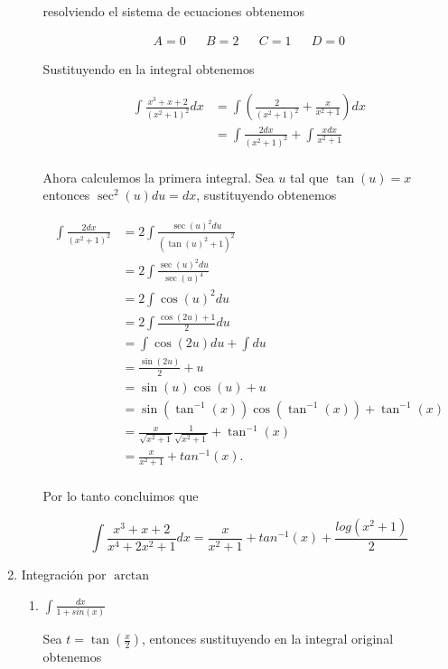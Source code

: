 \documentclass[letterpaper]{article}
\theoremstyle{definition}
\theoremstyle{lemathm}
\theoremstyle{lemademthm}
\begin{document}
\begin{enumerate}
\begin{enumerate}
			resolviendo el sistema de ecuaciones obtenemos

			\begin{align*}
				A = 0 && B = 2 && C = 1 && D = 0
			\end{align*}

			Sustituyendo en la integral obtenemos

			\begin{align*}
				\int \frac{x^3+x+2}{(x^2+1)^2} dx &= \int \left(\frac{2}{(x^2+1)^2} + \frac{x}{x^2+1}\right)dx\\
				&= \int \frac{2dx}{(x^2+1)^2} + \int\frac{xdx}{x^2+1}\\
			\end{align*}

			Ahora calculemos la primera integral. Sea $u$ tal que $\tan(u) = x$ entonces $\sec^2(u)du = dx$, sustituyendo obtenemos

			\begin{align*}
				\int \frac{2dx}{(x^2+1)^2} &= 2\int \frac{\sec(u)^2du}{(\tan(u)^2 + 1)^2}\\
				&= 2\int \frac{\sec(u)^2du}{\sec(u)^4}\\
				&= 2\int \cos(u)^2du\\
				&= 2\int \frac{\cos(2u)+1}{2}du\\
				&= \int \cos(2u)du + \int du\\
				&= \frac{\sin(2u)}{2} + u\\
				&= \sin(u)\cos(u) + u\\
				&= \sin(\tan^{-1}(x))\cos(\tan^{-1}(x)) + \tan^{-1}(x)\\
				&= \frac{x}{\sqrt{x^2 + 1}}\frac{1}{\sqrt{x^2+1}} + \tan^{-1}(x)\\
				&= \frac{x}{x^2 + 1} + tan^{-1}(x).\\
			\end{align*}

			Por lo tanto concluimos que

			\[\int \frac{x^3+x+2}{x^4+2x^2+1}dx = \frac{x}{x^2 + 1} + tan^{-1}(x) + \frac{log(x^2+1)}{2}\]

        \end{enumerate}

        \item Integración por $\arctan$
        
        \begin{enumerate}
            \item $\int \frac{dx}{1+sin(x)}$
			
			Sea $t = \tan\left(\frac{x}{2}\right)$, entonces sustituyendo en la integral original obtenemos


\end{enumerate}
\end{enumerate}
\end{document}

